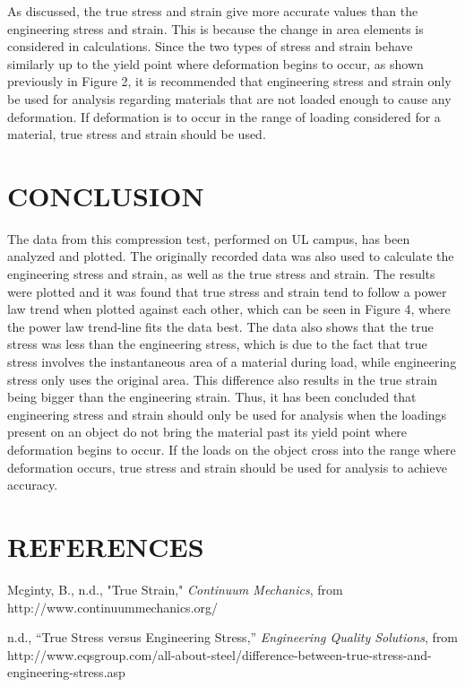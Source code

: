 \documentclass[12pt]{article}
\begin{document}
As discussed, the true stress and strain give more accurate values than the engineering stress and strain. This is because the change in area elements is considered in calculations. Since the two types of stress and strain behave similarly up to the yield point where deformation begins to occur, as shown previously in Figure 2, it is recommended that engineering stress and strain only be used for analysis regarding materials that are not loaded enough to cause any deformation. If deformation is to occur in the range of loading considered for a material, true stress and strain should be used. 

\newpage

\section*{\fontsize{12}{12}\selectfont CONCLUSION}
The data from this compression test, performed on UL campus, has been analyzed and plotted. The originally recorded data was also used to calculate the engineering stress and strain, as well as the true stress and strain. The results were plotted and it was found that true stress and strain tend to follow a power law trend when plotted against each other, which can be seen in Figure 4, where the power law trend-line fits the data best. The data also shows that the true stress was less than the engineering stress, which is due to the fact that true stress involves the instantaneous area of a material during load, while engineering stress only uses the original area. This difference also results in the true strain being bigger than the engineering strain. Thus, it has been concluded that engineering stress and strain should only be used for analysis when the loadings present on an object do not bring the material past its yield point where deformation begins to occur. If the loads on the object cross into the range where deformation occurs, true stress and strain should be used for analysis to achieve accuracy.
\bigskip


\section*{\fontsize{12}{12}\selectfont REFERENCES}

\begin{thebibliography}{2}

Mcginty, B., n.d.,
"True Strain," \emph{Continuum Mechanics}, from
http://www.continuummechanics.org/

\bibitem{}
n.d., “True Stress versus Engineering Stress,” \emph{Engineering Quality Solutions}, from
http://www.eqsgroup.com/all-about-steel/difference-between-true-stress-and-engineering-stress.asp

\end{thebibliography}


\end{document}
